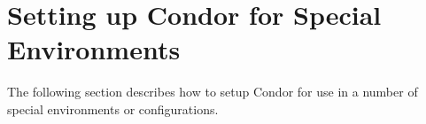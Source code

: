 \section{Setting up Condor for Special Environments}
\label{sec:special-environments}

The following section describes how to setup Condor for use in a
number of special environments or configurations.








